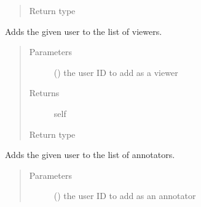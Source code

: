 \documentclass[letterpaper,10pt,english]{sphinxmanual}
\begin{document}
\begin{fulllineitems}
\begin{fulllineitems}
\begin{quote}
\begin{description}
\item[{Return type}] \leavevmode
{\hyperref[\detokenize{autoapi/pine/client/models/index:pine.client.models.CollectionBuilder}]{}}

\end{description}\end{quote}

\end{fulllineitems}


\begin{fulllineitems}
\label{\detokenize{autoapi/pine/client/index:pine.client.CollectionBuilder.viewer}}
Adds the given user to the list of viewers.
\begin{quote}\begin{description}
\item[{Parameters}] \leavevmode
{} () \textendash{} the user ID to add as a viewer

\item[{Returns}] \leavevmode
self

\item[{Return type}] \leavevmode
{\hyperref[\detokenize{autoapi/pine/client/models/index:pine.client.models.CollectionBuilder}]{}}

\end{description}\end{quote}

\end{fulllineitems}


\begin{fulllineitems}
\label{\detokenize{autoapi/pine/client/index:pine.client.CollectionBuilder.annotator}}
Adds the given user to the list of annotators.
\begin{quote}\begin{description}
\item[{Parameters}] \leavevmode
{} () \textendash{} the user ID to add as an annotator


\end{description}
\end{quote}
\end{fulllineitems}
\end{fulllineitems}
\end{document}
